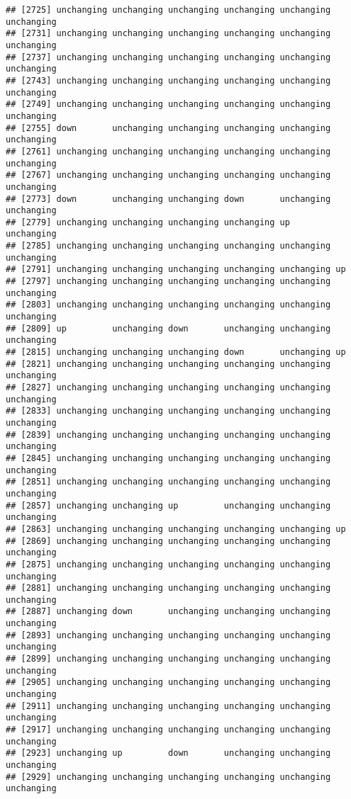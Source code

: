\documentclass[]{article}
\begin{document}
\begin{verbatim}
## [2725] unchanging unchanging unchanging unchanging unchanging unchanging
## [2731] unchanging unchanging unchanging unchanging unchanging unchanging
## [2737] unchanging unchanging unchanging unchanging unchanging unchanging
## [2743] unchanging unchanging unchanging unchanging unchanging unchanging
## [2749] unchanging unchanging unchanging unchanging unchanging unchanging
## [2755] down       unchanging unchanging unchanging unchanging unchanging
## [2761] unchanging unchanging unchanging unchanging unchanging unchanging
## [2767] unchanging unchanging unchanging unchanging unchanging unchanging
## [2773] down       unchanging unchanging down       unchanging unchanging
## [2779] unchanging unchanging unchanging unchanging up         unchanging
## [2785] unchanging unchanging unchanging unchanging unchanging unchanging
## [2791] unchanging unchanging unchanging unchanging unchanging up        
## [2797] unchanging unchanging unchanging unchanging unchanging unchanging
## [2803] unchanging unchanging unchanging unchanging unchanging unchanging
## [2809] up         unchanging down       unchanging unchanging unchanging
## [2815] unchanging unchanging unchanging down       unchanging up        
## [2821] unchanging unchanging unchanging unchanging unchanging unchanging
## [2827] unchanging unchanging unchanging unchanging unchanging unchanging
## [2833] unchanging unchanging unchanging unchanging unchanging unchanging
## [2839] unchanging unchanging unchanging unchanging unchanging unchanging
## [2845] unchanging unchanging unchanging unchanging unchanging unchanging
## [2851] unchanging unchanging unchanging unchanging unchanging unchanging
## [2857] unchanging unchanging up         unchanging unchanging unchanging
## [2863] unchanging unchanging unchanging unchanging unchanging up        
## [2869] unchanging unchanging unchanging unchanging unchanging unchanging
## [2875] unchanging unchanging unchanging unchanging unchanging unchanging
## [2881] unchanging unchanging unchanging unchanging unchanging unchanging
## [2887] unchanging down       unchanging unchanging unchanging unchanging
## [2893] unchanging unchanging unchanging unchanging unchanging unchanging
## [2899] unchanging unchanging unchanging unchanging unchanging unchanging
## [2905] unchanging unchanging unchanging unchanging unchanging unchanging
## [2911] unchanging unchanging unchanging unchanging unchanging unchanging
## [2917] unchanging unchanging unchanging unchanging unchanging unchanging
## [2923] unchanging up         down       unchanging unchanging unchanging
## [2929] unchanging unchanging unchanging unchanging unchanging unchanging

\end{verbatim}
\end{document}
